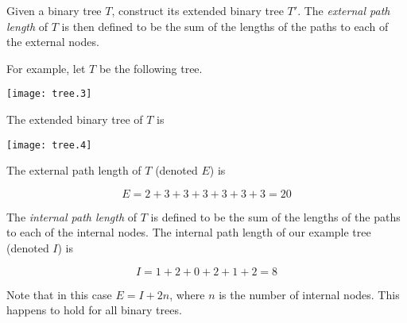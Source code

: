 \documentclass[12pt]{article}
\begin{document}
Given a binary tree $T$, construct its extended binary tree $T'$.
The \emph{external path length} of $T$ is then defined to be the sum of the lengths of the paths to each of the external nodes.

For example, let $T$ be the following tree.

\begin{center}
\texttt{[image: tree.3]}
\end{center}

The extended binary tree of $T$ is

\begin{center}
\texttt{[image: tree.4]}
\end{center}

The external path length of $T$ (denoted $E$) is

$$
E = 2 + 3 + 3 + 3 + 3 + 3 + 3 = 20
$$

The \emph{internal path length} of $T$ is defined to be the sum of the lengths of the paths to each of the internal nodes.  The internal path length of our example tree (denoted $I$) is

$$
I = 1 + 2 + 0 + 2 + 1 + 2 = 8
$$

Note that in this case $E = I + 2n$, where $n$ is the number of internal nodes.  This happens to hold for all binary trees.
\end{document}
